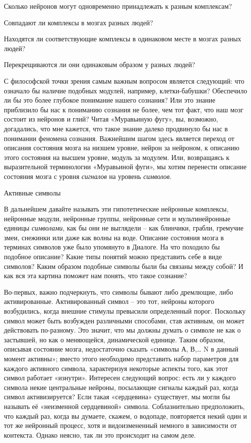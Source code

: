 \documentclass[../main.tex]{subfiles}
\begin{document}
Сколько нейронов могут одновременно принадлежать к разным комплексам?

Совпадают ли комплексы в мозгах разных людей?

Находятся ли соответствующие комплексы в одинаковом месте в мозгах разных людей?

Перекрещиваются ли они одинаковым образом у разных людей?

С философской точки зрения самым важным вопросом является следующий: что означало бы наличие подобных модулей, например, клетки-бабушки? Обеспечило ли бы это более глубокое понимание нашего сознания? Или это знание приблизило бы нас к пониманию сознания не более, чем тот факт, что наш мозг состоит из нейронов и глий? Читая «Муравьиную фугу», вы, возможно, догадались, что мне кажется, что такое знание далеко продвинуло бы нас в понимании феномена сознания. Важнейшим шагом здесь является переход от описания состояния мозга на низшем уровне, нейрон за нейроном, к описанию этого состояния на высшем уровне, модуль за модулем. Или, возвращаясь к выразительной терминологии «Муравьиной фуги», мы хотим перенести описание состояния мозга с уровня \emph{сигналов} на уровень \emph{символов}.

Активные символы

В дальнейшем давайте называть эти гипотетические нейронные комплексы, нейронные модули, нейронные группы, нейронные сети и мультинейронные единицы \emph{символами}, как бы они не выглядели \--- как блинчики, грабли, гремучие змеи, снежинки или даже как волны на воде. Описание состояния мозга в терминах символов уже было упомянуто в Диалоге. На что походило бы подобное описание? Какие типы понятий можно представить себе в виде символов? Каким образом подобные символы были бы связаны между собой? И как вся эта картина поможет нам понять, что такое сознание?

Во-первых, важно подчеркнуть, что символы бывают либо дремлющие, либо активированные. Активированный символ \--- это тот, нейроны которого возбудились, когда внешние стимулы превысили определенный порог. Поскольку символ может быть возбужден различными способами, став активным, он может действовать по-разному. Это значит, что мы должны думать о символе не как о застывшей, но как о меняющейся, динамической единице. Таким образом, описывая состояние мозга, недостаточно сказать «символы А, В,\ldots{} N в данный момент активны»; вместо этого необходимо представить набор параметров для каждого активного символа, характеризуя некоторые аспекты того, как этот символ работает «изнутри». Интересен следующий вопрос: есть ли у каждого символа некие центральные нейроны, посылающие сигналы каждый раз, когда символ активизируется? Если такая «сердцевина» существует, мы могли бы называть её «неизменной сердцевиной» символа. Соблазнительно предположить, что каждый раз, когда вы думаете, скажем, о водопаде, повторяется некий один и тот же нейронный процесс, хотя и видоизмененный немного в зависимости от контекста. Однако неясно, так ли это происходит на самом деле.
\end{document}

